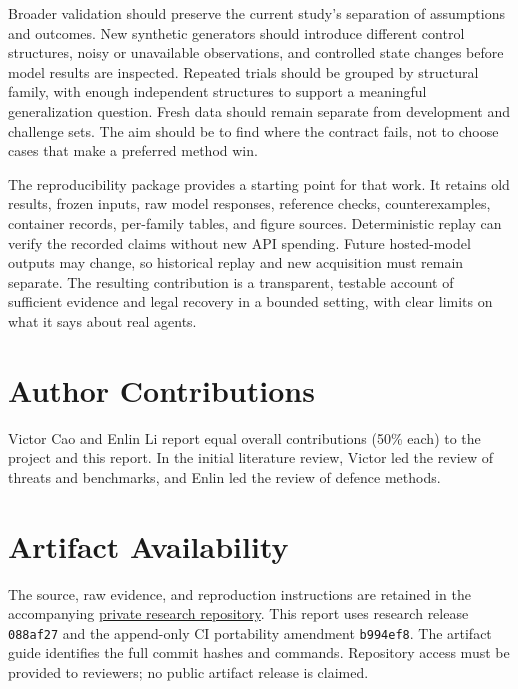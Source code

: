 \documentclass[conference]{IEEEtran}
\newcommand{\code}[1]{\texttt{#1}}
\begin{document}
Broader validation should preserve the current study's separation of assumptions and outcomes. New synthetic generators should introduce different control structures, noisy or unavailable observations, and controlled state changes before model results are inspected. Repeated trials should be grouped by structural family, with enough independent structures to support a meaningful generalization question. Fresh data should remain separate from development and challenge sets. The aim should be to find where the contract fails, not to choose cases that make a preferred method win.

The reproducibility package provides a starting point for that work. It retains old results, frozen inputs, raw model responses, reference checks, counterexamples, container records, per-family tables, and figure sources. Deterministic replay can verify the recorded claims without new API spending. Future hosted-model outputs may change, so historical replay and new acquisition must remain separate. The resulting contribution is a transparent, testable account of sufficient evidence and legal recovery in a bounded setting, with clear limits on what it says about real agents.

\section*{Author Contributions}
\balance
Victor Cao and Enlin Li report equal overall contributions (50\% each) to the project and this report. In the initial literature review, Victor led the review of threats and benchmarks, and Enlin led the review of defence methods.

\section*{Artifact Availability}
The source, raw evidence, and reproduction instructions are retained in the accompanying \href{https://github.com/victorcao1104/taskskillguard-research}{private research repository}. This report uses research release \code{088af27} and the append-only CI portability amendment \code{b994ef8}. The artifact guide identifies the full commit hashes and commands. Repository access must be provided to reviewers; no public artifact release is claimed.

\clearpage
\nobalance
{}

\end{document}
